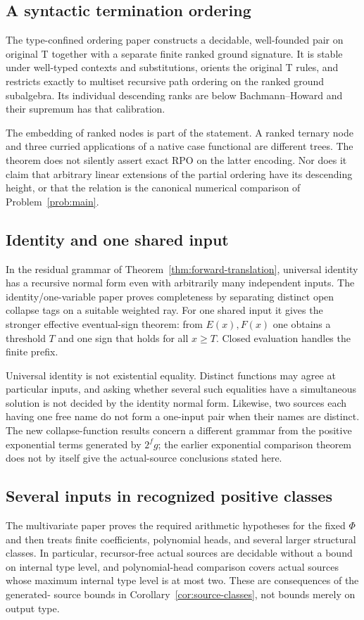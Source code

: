 \documentclass[11pt,a4paper]{article}
\begin{document}
\subsection{A syntactic termination ordering}
The type-confined ordering paper \cite{wwordering} constructs a decidable,
well-founded pair on original T together with a separate finite ranked
ground signature.  It is stable under well-typed contexts and substitutions,
orients the original T rules, and restricts exactly to multiset recursive
path ordering on the ranked ground subalgebra.  Its individual descending
ranks are below Bachmann--Howard and their supremum has that calibration.

The embedding of ranked nodes is part of the statement.  A ranked ternary
node and three curried applications of a native case functional are different
trees.  The theorem does not silently assert exact RPO on the latter encoding.
Nor does it claim that arbitrary linear extensions of the partial ordering
have its descending height, or that the relation is the canonical numerical
comparison of Problem~\ref{prob:main}.

\subsection{Identity and one shared input}
In the residual grammar of Theorem~\ref{thm:forward-translation}, universal identity
has a recursive normal form even with arbitrarily many independent inputs.
The identity/one-variable paper \cite{wwunivariate} proves completeness by
separating distinct open collapse tags on a suitable weighted ray.
For one shared input it gives the stronger effective eventual-sign theorem:
from $E(x),F(x)$ one obtains a threshold $T$ and one sign that holds for all
$x\ge T$.  Closed evaluation handles the finite prefix.

Universal identity is not existential equality.  Distinct functions may agree
at particular inputs, and asking whether several such equalities have a
simultaneous solution is not decided by the identity normal form.  Likewise,
two sources each having one free name do not form a one-input pair when
their names are distinct.  The new collapse-function results concern a
different grammar from the positive exponential terms generated by
$2^f g$; the earlier exponential comparison theorem does not by itself give
the actual-source conclusions stated here.

\subsection{Several inputs in recognized positive classes}
The multivariate paper \cite{wwmultivariate} proves the required arithmetic
hypotheses for the fixed $\Phi$ and then treats finite coefficients,
polynomial heads, and several larger structural classes.  In particular,
recursor-free actual sources are decidable without a bound on internal type
level, and polynomial-head comparison covers actual sources whose maximum
internal type level is at most two.  These are consequences of the generated-
source bounds in Corollary~\ref{cor:source-classes}, not bounds merely on output type.
\end{document}
